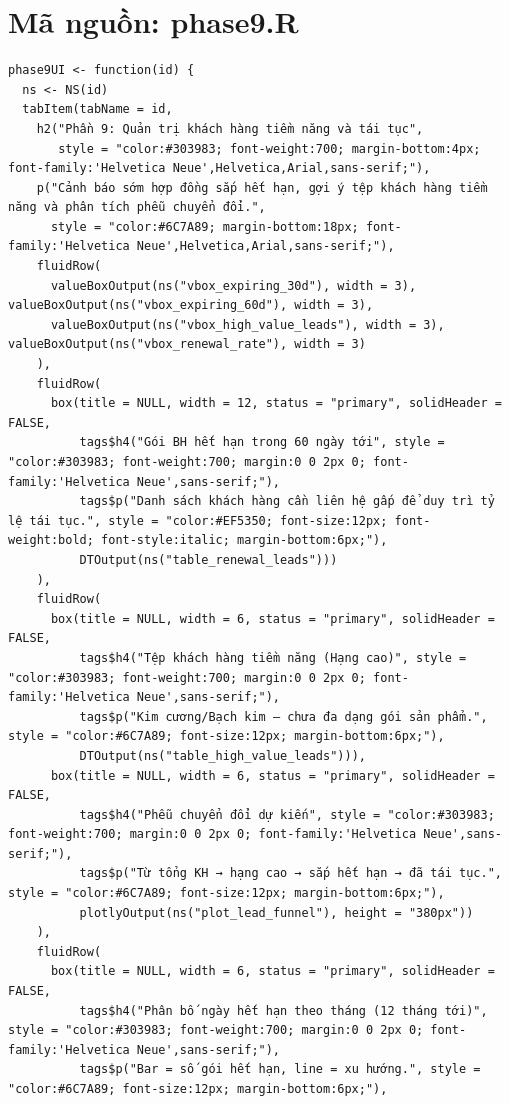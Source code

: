 \documentclass[12pt, a4paper]{article}
\begin{document}
\section{Mã nguồn: phase9.R}
\begin{lstlisting}
phase9UI <- function(id) {
  ns <- NS(id)
  tabItem(tabName = id,
    h2("Phần 9: Quản trị khách hàng tiềm năng và tái tục",
       style = "color:#303983; font-weight:700; margin-bottom:4px; font-family:'Helvetica Neue',Helvetica,Arial,sans-serif;"),
    p("Cảnh báo sớm hợp đồng sắp hết hạn, gợi ý tệp khách hàng tiềm năng và phân tích phễu chuyển đổi.",
      style = "color:#6C7A89; margin-bottom:18px; font-family:'Helvetica Neue',Helvetica,Arial,sans-serif;"),
    fluidRow(
      valueBoxOutput(ns("vbox_expiring_30d"), width = 3), valueBoxOutput(ns("vbox_expiring_60d"), width = 3),
      valueBoxOutput(ns("vbox_high_value_leads"), width = 3), valueBoxOutput(ns("vbox_renewal_rate"), width = 3)
    ),
    fluidRow(
      box(title = NULL, width = 12, status = "primary", solidHeader = FALSE,
          tags$h4("Gói BH hết hạn trong 60 ngày tới", style = "color:#303983; font-weight:700; margin:0 0 2px 0; font-family:'Helvetica Neue',sans-serif;"),
          tags$p("Danh sách khách hàng cần liên hệ gấp để duy trì tỷ lệ tái tục.", style = "color:#EF5350; font-size:12px; font-weight:bold; font-style:italic; margin-bottom:6px;"),
          DTOutput(ns("table_renewal_leads")))
    ),
    fluidRow(
      box(title = NULL, width = 6, status = "primary", solidHeader = FALSE,
          tags$h4("Tệp khách hàng tiềm năng (Hạng cao)", style = "color:#303983; font-weight:700; margin:0 0 2px 0; font-family:'Helvetica Neue',sans-serif;"),
          tags$p("Kim cương/Bạch kim — chưa đa dạng gói sản phẩm.", style = "color:#6C7A89; font-size:12px; margin-bottom:6px;"),
          DTOutput(ns("table_high_value_leads"))),
      box(title = NULL, width = 6, status = "primary", solidHeader = FALSE,
          tags$h4("Phễu chuyển đổi dự kiến", style = "color:#303983; font-weight:700; margin:0 0 2px 0; font-family:'Helvetica Neue',sans-serif;"),
          tags$p("Từ tổng KH → hạng cao → sắp hết hạn → đã tái tục.", style = "color:#6C7A89; font-size:12px; margin-bottom:6px;"),
          plotlyOutput(ns("plot_lead_funnel"), height = "380px"))
    ),
    fluidRow(
      box(title = NULL, width = 6, status = "primary", solidHeader = FALSE,
          tags$h4("Phân bố ngày hết hạn theo tháng (12 tháng tới)", style = "color:#303983; font-weight:700; margin:0 0 2px 0; font-family:'Helvetica Neue',sans-serif;"),
          tags$p("Bar = số gói hết hạn, line = xu hướng.", style = "color:#6C7A89; font-size:12px; margin-bottom:6px;"),

\end{lstlisting}
\end{document}
